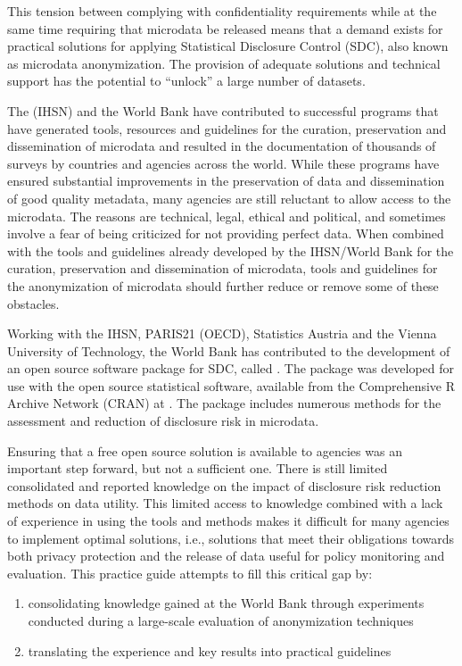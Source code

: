 \documentclass[letterpaper,10pt,english]{sphinxmanual}
\begin{document}
This tension between complying with confidentiality requirements while
at the same time requiring that microdata be released means that a
demand exists for practical solutions for applying Statistical
Disclosure Control (SDC), also known as microdata anonymization. The
provision of adequate solutions and technical support has the potential
to “unlock” a large number of datasets.

The  (IHSN)
and the World Bank have contributed to successful programs that have
generated tools, resources and guidelines for the curation, preservation
and dissemination of microdata and resulted in the documentation of
thousands of surveys by countries and agencies across the world. While
these programs have ensured substantial improvements in the preservation
of data and dissemination of good quality metadata, many agencies are
still reluctant to allow access to the microdata. The reasons are
technical, legal, ethical and political, and sometimes involve a fear of
being criticized for not providing perfect data. When combined with the
tools and guidelines already developed by the IHSN/World Bank for the
curation, preservation and dissemination of microdata, tools and
guidelines for the anonymization of microdata should further reduce or
remove some of these obstacles.

Working with the IHSN, PARIS21 (OECD), Statistics Austria and the Vienna
University of Technology, the World Bank has contributed to the
development of an open source software package for SDC, called
. The package was developed for use with the open source 
statistical software, available from the Comprehensive R Archive Network
(CRAN) at . The package includes numerous
methods for the assessment and reduction of disclosure risk in
microdata.

Ensuring that a free open source solution is available to agencies was
an important step forward, but not a sufficient one. There is still
limited consolidated and reported knowledge on the impact of disclosure
risk reduction methods on data utility. This limited access to knowledge
combined with a lack of experience in using the tools and methods makes
it difficult for many agencies to implement optimal solutions, i.e.,
solutions that meet their obligations towards both privacy protection
and the release of data useful for policy monitoring and evaluation.
This practice guide attempts to fill this critical gap by:
\begin{enumerate}
\item {} 
consolidating knowledge gained at the World Bank through
experiments conducted during a large-scale evaluation of
anonymization techniques

\item {} 
translating the experience and key results into practical
guidelines

\end{enumerate}
\end{document}
